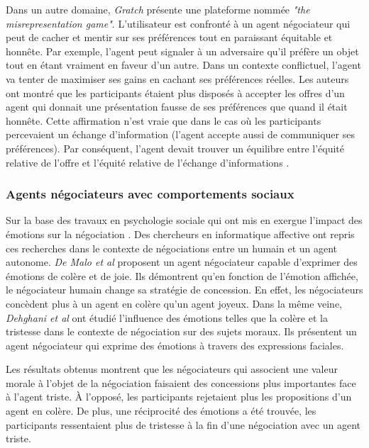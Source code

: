 	Dans un autre domaine, \emph{Gratch} \cite{gratch2016misrepresentation} présente une plateforme nommée \emph{"the misrepresentation game"}. L'utilisateur est confronté à un agent négociateur qui peut de cacher et mentir sur ses préférences tout en paraissant équitable et honnête. Par exemple, l'agent peut signaler à un adversaire qu'il préfère un objet tout en étant vraiment en faveur d'un autre. Dans un contexte conflictuel, l'agent va tenter de maximiser ses gains en cachant ses préférences réelles. Les auteurs ont montré que les participants étaient plus disposés à accepter les offres d'un agent qui donnait une présentation fausse de ses préférences que quand il était honnête. Cette affirmation n'est vraie que dans le cas où les participants percevaient un échange d'information (l'agent accepte aussi de communiquer ses  préférences). Par conséquent, l'agent devait trouver un équilibre entre l'équité relative de l'offre et l'équité relative de l'échange d'informations \cite{gratch2016misrepresentation}.
	
	\subsubsection{Agents négociateurs avec comportements sociaux}
	
	Sur la base des travaux en psychologie sociale qui ont mis en exergue l'impact des émotions sur la négociation \cite{van2006power}. Des chercheurs en informatique affective ont repris ces recherches dans le contexte de négociations entre un humain et un agent autonome. \emph{De Malo et al} \cite{de2011effect,de2015humans} proposent un agent négociateur capable d'exprimer des émotions de colère et de joie. Ils démontrent qu'en fonction de l'émotion affichée, le négociateur humain change sa stratégie de concession. En effet, les négociateurs concèdent plus à un agent en colère qu'un agent joyeux. Dans la même veine, \emph{Dehghani et al} \cite{dehghani2014interpersonal} ont étudié l'influence des émotions telles que la colère et la tristesse dans le contexte de négociation sur des sujets moraux. Ils présentent un agent négociateur qui exprime des émotions à travers des expressions faciales.
	
	Les résultats obtenus montrent que les négociateurs qui associent une valeur morale à l'objet de la négociation faisaient des concessions plus importantes face à l'agent triste. À l'opposé, les participants rejetaient plus les propositions d'un agent en colère. De plus, une réciprocité des émotions a été trouvée, les participants ressentaient plus de tristesse à la fin d'une négociation avec un agent triste.  
	
